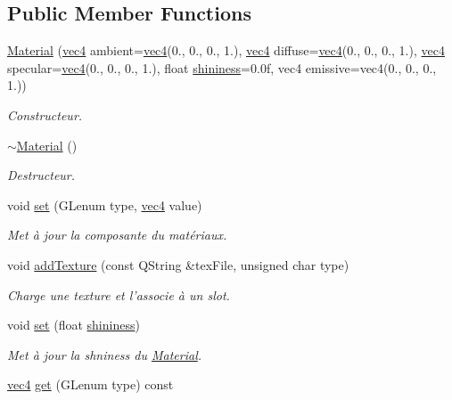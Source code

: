 \subsection*{Public Member Functions}
\begin{DoxyCompactItemize}
\item 
\hyperlink{class_material_a262f6ab1d9c846fe72300764bc0389a7}{Material} (\hyperlink{structvec4}{vec4} ambient=\hyperlink{structvec4}{vec4}(0., 0., 0., 1.), \hyperlink{structvec4}{vec4} diffuse=\hyperlink{structvec4}{vec4}(0., 0., 0., 1.), \hyperlink{structvec4}{vec4} specular=\hyperlink{structvec4}{vec4}(0., 0., 0., 1.), float \hyperlink{class_material_a9a938aa96f0d5a5dc4d17d43cfd4b42b}{shininess}=0.\+0f, vec4 emissive=vec4(0., 0., 0., 1.))
\begin{DoxyCompactList}\small\item\em Constructeur. \end{DoxyCompactList}\item 
\hyperlink{class_material_a2c19452d71f54075df8f5405b03129f4}{$\sim$\+Material} ()
\begin{DoxyCompactList}\small\item\em Destructeur. \end{DoxyCompactList}\item 
void \hyperlink{class_material_a2ab92e03d9c90294cd28fff9b6a8cde0}{set} (G\+Lenum type, \hyperlink{structvec4}{vec4} value)
\begin{DoxyCompactList}\small\item\em Met à jour la composante du matériaux. \end{DoxyCompactList}\item 
void \hyperlink{class_material_aae1b7e4c0ae1fec27d28a7e62c9a0bd4}{add\+Texture} (const Q\+String \&tex\+File, unsigned char type)
\begin{DoxyCompactList}\small\item\em Charge une texture et l'associe à un slot. \end{DoxyCompactList}\item 
void \hyperlink{class_material_a3de47a95f13dc6f6306493516814762c}{set} (float \hyperlink{class_material_a9a938aa96f0d5a5dc4d17d43cfd4b42b}{shininess})
\begin{DoxyCompactList}\small\item\em Met à jour la shniness du \hyperlink{class_material}{Material}. \end{DoxyCompactList}\item 
\hyperlink{structvec4}{vec4} \hyperlink{class_material_a59a7e83068d2be75fda72bf509ccff3c}{get} (G\+Lenum type) const 

\end{DoxyCompactItemize}
